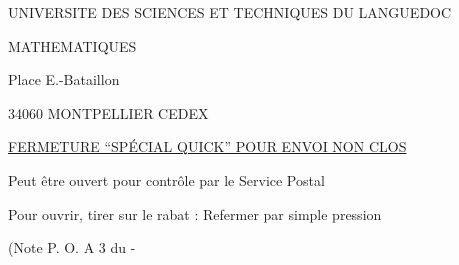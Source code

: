 UNIVERSITE DES SCIENCES ET TECHNIQUES
DU LANGUEDOC

MATHEMATIQUES

Place E.-Bataillon

34060 MONTPELLIER CEDEX


\uline{FERMETURE ``SPÉCIAL QUICK'' POUR ENVOI NON CLOS}

Peut être ouvert pour contrôle par le Service Postal

Pour ouvrir, tirer sur le rabat : Refermer par simple pression

(Note P. O. A 3 du  -  
